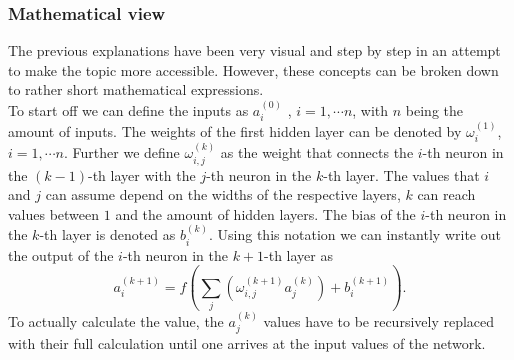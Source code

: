 \subsubsection{Mathematical view}
The previous explanations have been very visual and step by step in an attempt to make the topic more accessible. However, these concepts can be broken down to rather short mathematical expressions.\\
To start off we can define the inputs as $a_i^{(0)}$ , $i =  1, \dotsb n$, with $n$ being the amount of inputs. The weights of the first hidden layer can be denoted by $\omega_{i}^{(1)}$, $i =  1, \dotsb n$. Further we define $\omega_{i,j}^{(k)}$ as the weight that connects the $i$-th neuron in the $(k-1)$-th layer with the $j$-th neuron in the $k$-th layer. The values that $i$ and $j$ can assume depend on the widths of the respective layers, $k$ can reach values between $1$ and the amount of hidden layers. The bias of the $i$-th neuron in the $k$-th layer is denoted as $b_i^{(k)}$. Using this notation we can instantly write out the output of the $i$-th neuron in the $k+1$-th layer as
\begin{equation}
	a_i^{(k+1)} = f\left(\sum_j \left(\omega_{i,j}^{(k+1)}a_j^{(k)}\right) + b_i^{(k+1)}\right).
\end{equation}
To actually calculate the value, the $a_j^{(k)}$ values have to be recursively replaced with their full calculation until one arrives at the input values of the network.
